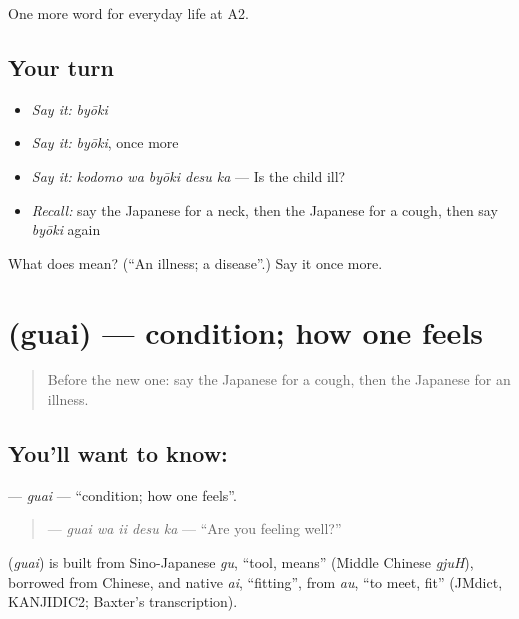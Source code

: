 \begin{grammarlens}[title={What you've built}]
One more word for everyday life at A2.
\end{grammarlens}

\subsection*{Your turn}
\begin{itemize}
\raggedright
  \item \emph{Say it:} \emph{byōki}
  \item \emph{Say it:} \emph{byōki}, once more
  \item \emph{Say it:} \emph{kodomo wa byōki desu ka} — Is the child ill?
  \item \emph{Recall:} say the Japanese for a neck, then the Japanese for a cough, then say \emph{byōki} again
\end{itemize}

\begin{tcolorbox}[breakable,colback=teal!4,colframe=teal!35!black,title={Before you move on}]
What does  mean? (\textquotedblleft{}An illness; a disease\textquotedblright{}.) Say it once more.
\end{tcolorbox}
\section[\texorpdfstring{\ja{ぐあい} (guai)}{ぐあい (guai)}]{ (guai) — condition; how one feels}

\label{lesson:JA-C216-guai}



\begin{quote}
Before the new one: say the Japanese for a cough, then the Japanese for an illness.
\end{quote}

\subsection*{You'll want to know: }
\textbf{} — \emph{guai} — \textquotedblleft{}condition; how one feels\textquotedblright{}.

\begin{quote}
\textbf{ } — \emph{guai wa ii desu ka} — \textquotedblleft{}Are you feeling well?\textquotedblright{}
\end{quote}

\begin{cousinweb}
\textbf{} (\emph{guai}) is built from Sino-Japanese \emph{gu}, \textquotedblleft{}tool, means\textquotedblright{} (Middle Chinese \emph{gjuH}), borrowed from Chinese, and native \emph{ai}, \textquotedblleft{}fitting\textquotedblright{}, from \emph{au}, \textquotedblleft{}to meet, fit\textquotedblright{} (JMdict, KANJIDIC2; Baxter's transcription).
\end{cousinweb}


